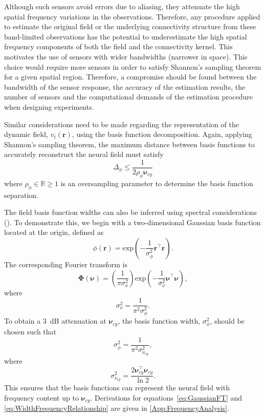\documentclass[5p,authoryear]{elsarticle}
\begin{document}
Although such sensors avoid errors due to aliasing, they attenuate the high spatial frequency variations in the observations. Therefore, any procedure applied to estimate the original field or the underlying connectivity structure from these band-limited observations has the potential to underestimate the high spatial frequency components of both the field and the connectivity kernel. This motivates the use of sensors with wider bandwidths (narrower in space). This choice would require more sensors in order to satisfy Shannon's sampling theorem for a given spatial region. Therefore, a compromise should be found between the bandwidth of the sensor response, the accuracy of the estimation results, the number of sensors and the computational demands of the estimation procedure when designing experiments.

Similar considerations need to be made regarding the representation of the dynamic field, $v_t(\mathbf{r})$, using the basis function decomposition. Again, applying Shannon's sampling theorem, the maximum distance between basis functions to accurately reconstruct the neural field must satisfy 
\begin{equation}\label{eq:BasisFunctionSeparation}
	\Delta_{\phi} \leq \frac{1}{2\rho_{\phi}\boldsymbol{\nu}_{cy}}
\end{equation}
where $\rho_{\phi} \in \mathbb{R} \ge 1$ is an oversampling parameter to determine the basis function separation. 

The field basis function widths can also be inferred using spectral considerations (\cite{Sanner1992,Scerri2009}). To demonstrate this, we begin with a two-dimensional Gaussian basis function located at the origin, defined as
\begin{equation}\label{eq:BasisFunctionAtOrigin}
 \phi(\mathbf r)=\mathrm{exp}\left({-\frac{1}{\sigma_{\phi}^2} \mathbf r^\top\mathbf r}\right).
\end{equation}
The corresponding Fourier transform is
\begin{equation}\label{eq:GaussianFT}
\boldsymbol\Phi(\boldsymbol \nu)=\left(\frac{1}{\pi\sigma_{\nu}^2}\right)\mathrm{exp}\left(-\frac{1}{\sigma_{\nu}^2}\boldsymbol\nu^\top \boldsymbol\nu\right),
\end{equation}
where 
\begin{equation}\label{eq:GaussianFTWidth}
	\sigma^2_{\nu} = \frac{1}{\pi^2\sigma_{\phi}^2}. 
\end{equation}
To obtain a 3~dB attenuation at $\boldsymbol\nu_{cy}$, the basis function width, $\sigma^2_{\phi}$, should be chosen such that
\begin{equation}\label{eq:WidthCutOffRelationship}
 \sigma^2_{\phi}= \frac{1}{\pi^2\sigma_{\nu_{cy}}^2},
\end{equation}
where
\begin{equation}\label{eq:WidthFrequencyRelationship}
 \sigma^2_{\nu_{cy}}= \frac{2\boldsymbol\nu_{cy}^\top \boldsymbol\nu_{cy}}{\ln2}.
\end{equation}
This ensures that the basis functions can represent the neural field with frequency content up to $\boldsymbol\nu_{cy}$. Derivations for equations~\ref{eq:GaussianFT} and \ref{eq:WidthFrequencyRelationship} are given in \ref{App:FrequencyAnalysis}.
\end{document}
